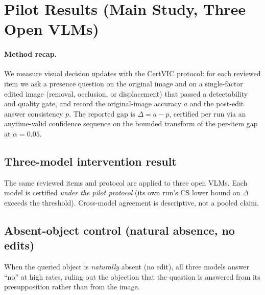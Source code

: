 \section{Pilot Results (Main Study, Three Open VLMs)}

\paragraph{Method recap.}
We measure visual decision updates with the CertVIC protocol: for each reviewed item we
ask a presence question on the original image and on a single-factor edited image
(removal, occlusion, or displacement) that passed a detectability and quality gate, and
record the original-image accuracy $a$ and the post-edit answer consistency $p$. The
reported gap is $\Delta = a - p$, certified per run via an anytime-valid confidence
sequence on the bounded transform of the per-item gap at $\alpha = 0.05$.

\subsection{Three-model intervention result}
The same reviewed items and protocol are applied to three open VLMs. Each model is
certified \emph{under the pilot protocol} (its own run's CS lower bound on $\Delta$ exceeds
the threshold). Cross-model agreement is descriptive, not a pooled claim.


\subsection{Absent-object control (natural absence, no edits)}
When the queried object is \emph{naturally} absent (no edit), all three models answer
``no'' at high rates, ruling out the objection that the question is answered from its
presupposition rather than from the image.


